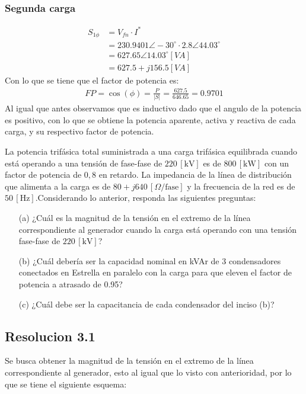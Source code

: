 \documentclass[
  11pt,
  letterpaper,
   addpoints,
  ]{exam}
\begin{document}
\begin{questions}
\begin{solution}
\subsubsection*{Segunda carga}
\begin{align}
    S_{1\phi} &= V_{fn} \cdot I^{*}\\
    &= 230.9401 \angle -30^{\circ} \cdot 2.8 \angle 44.03^{\circ}\\
    &= 627.65 \angle 14.03^{\circ} [VA]\\
    &= 627.5 + j 156.5 [VA]
\end{align}
Con lo que se tiene que el factor de potencia es:
\begin{align}
    FP = \cos(\phi) = \frac{P}{|S|} = \frac{627.5}{646.65} = 0.9701
\end{align}
Al igual que antes observamos que es inductivo dado que el angulo de la potencia es positivo, con lo que se obtiene la potencia aparente, activa y reactiva de cada carga, y su respectivo factor de potencia.
\end{solution}
\question La potencia trifásica total suministrada a una carga trifásica equilibrada cuando está operando a una tensión de fase-fase de \(220 \, [\text{kV}]\) es de \(800 \, [\text{kW}]\) con un factor de potencia de \(0,8\) en retardo. La impedancia de la línea de distribución que alimenta a la carga es de \(80 + j640 \, [\Omega/\text{fase}]\) y la frecuencia de la red es de \(50 \, [\text{Hz}]\).Considerando lo anterior, responda las siguientes preguntas:
\begin{enumerate}
    \item[(a)] ¿Cuál es la magnitud de la tensión en el extremo de la línea correspondiente al generador cuando la carga está operando con una tensión fase-fase de \(220 \, [\text{kV}]\)?
    \item[(b)] ¿Cuál debería ser la capacidad nominal en kVAr de 3 condensadores conectados en Estrella en paralelo con la carga para que eleven el factor de potencia a atrasado de 0.95?
    \item[(c)] ¿Cuál debe ser la capacitancia de cada condensador del inciso (b)?
\end{enumerate}
\begin{solution}
    \subsection*{Resolucion 3.1}
    Se busca obtener la magnitud de la tensión en el extremo de la línea correspondiente al generador, esto al igual que lo visto con anterioridad, por lo que se tiene el siguiente esquema:
    \begin{center}
        \begin{circuitikz}


\end{circuitikz}
\end{center}
\end{solution}
\end{questions}
\end{document}
